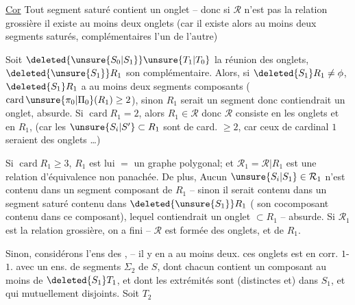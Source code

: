 \uline{Cor} Tout  segment saturé contient un onglet -- donc si $\mathcal{R}$ n'est pas la relation grossière il existe au moins deux onglets (car il existe alors au moins deux segments saturés, complémentaires l'un de l'autre)

Soit  $\deleted{\unsure{S_{0}|S_1}}\unsure{T_{1}|T_{0}}$ la réunion des onglets, $\deleted{\unsure{S_1}}R_1$ son complémentaire. Alors, si $\deleted{S_1}R_1\ne\phi$, $\deleted{S_1}R_1$ a au moins deux segments composants ($\operatorname{card}\unsure{\pi_0|\Pi_0}(R_1)\geq 2$), sinon $R_1$ serait un segment donc contiendrait un onglet, absurde. Si $\operatorname{card} R_1=2$, alors $R_1\in\mathcal{R}$  donc $\mathcal{R}$ consiste en les onglets et en $R_1$, (car  les $\unsure{S_i|S'}\subset R_1$ sont de card. $\geq 2$,  car ceux de cardinal $1$ seraient des onglets \ldots)

Si $\operatorname{card} R_1\geq 3$, $R_1$ est lui $=$ un graphe polygonal; et $\mathcal{R}_1=\mathcal{R}\vert R_1$ est une relation d'équivalence non panachée. De plus, Aucun $\unsure{S_i|S_1}\in\mathcal{R}_1$ n'est contenu dans un segment composant de $R_1$ -- sinon il serait contenu dans un segment saturé contenu dans $\deleted{\unsure{S_1}}R_1$ ( son cocomposant contenu dans ce composant), lequel contiendrait un onglet $\subset R_1$ -- absurde. Si $\mathcal{R}_1$ est la relation grossière, on a fini -- $\mathcal{R}$ est formée des onglets, et de $R_1$.

Sinon, considérons l'ens des ,  -- il y en a au moins deux.  ces onglets est en corr. $1$-$1$. avec un ens. de \unsure{(}segments $\Sigma_2$ de $S$, dont chacun contient un composant au moins de $\deleted{S_1}T_1$, et dont les extrémités sont (distinctes et) dans $S_1$, et qui  mutuellement disjoints. Soit $T_2$


